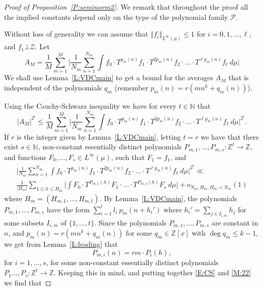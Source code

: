 \documentclass[11pt]{amsart}
\newcommand{\N}{\mathbb{N}}
\newcommand{\Z}{\mathbb{Z}}
\newcommand{\norm}[1]{\left\Vert #1\right\Vert}
\theoremstyle{plain}
\theoremstyle{definition}
\theoremstyle{remark}
\begin{document}
\begin{proof}[Proof of Proposition~\ref{P:seminorm2}]
We remark that  throughout the proof all the implied constants depend only on the type of
  the polynomial family  $\mathcal{P}$.

  Without loss of generality we can assume that
  $\norm{f_i}_{L^\infty(\mu)}\leq 1$ for $i=0,1,\ldots,\ell$, and $f_1
  \bot \mathcal{Z}$.  Let
  $$
 A_M=\frac{1}{M}\sum_{m=1}^M \Big|\frac{1}{N_m}\sum_{n=1}^{N_m} \int f_0\cdot  T^{p_m(n)} f_1
    \cdot T^{2p_m(n)}f_2\cdot\ldots\cdot T^{\ell p_m(n)}f_\ell\ d\mu\Big|
     $$
  We shall use Lemma~\ref{L:VDCmain} to get a bound for the averages
  $A_M$ that is independent of the polynomials $q_m$ (remember $p_m(n)=r(mn^k+q_m(n))$).


  Using the Cauchy-Schwarz inequality we have for every $t\in\N$ that
  \begin{equation}\label{E:CS}
    |A_M|^{2^t} \leq \frac{1}{M}\sum_{m=1}^{M}
      \Big| \frac{1}{N_m}\sum_{n=1}^{N_m} \int f_0\cdot  T^{p_m(n)}f_1
      \cdot T^{2p_m(n)}f_2\cdot\ldots\cdot T^{\ell p_m(n)}f_\ell\ d\mu\Big|^{2^t}.
  \end{equation}
  If $r$ is the integer given by Lemma~\ref{L:VDCmain}, letting $t=r$ we have that
  there exist $s \in \N$, non-constant essentially distinct polynomials
  $P_{m,1},\ldots,P_{m,s}\colon \Z^t\to\Z$, and functions
  $F_0,\ldots,F_s\in L^\infty(\mu)$, such that $F_1=f_1$, and
  \begin{multline}\label{M:22}
    \Big| \frac{1}{N_m}\sum_{n=1}^{N_m} \int f_0 \cdot T^{p_m(n)}f_1
      \cdot T^{2p_m(n)}f_2\cdot\ldots\cdot T^{\ell p_m(n)}f_\ell \ d\mu\Big|^{2^t}\ll \\
    \frac{1}{|H_m|}\sum_{1\leq h\leq H_m}\Big|\int F_0 \cdot
    T^{P_{m,1}(h)}F_1\cdot \ldots\cdot T^{P_{m,s}(h)}F_s \ d\mu \Big|
    +o_{N_m,H_m, H_m\prec N_m}(1)
  \end{multline}
  where $H_m=(H_{m,1},\ldots,H_{m,t})$.  By Lemma~\ref{L:VDCmain}, the
  polynomials $P_{m,1},\ldots, P_{m,s}$ have the form $ \sum_{i=1}^t
  l_i \ \! p_m(n+h_i') $ where $h_i'= \sum_{j\in I_{i,m}}h_j$ for some
  subsets $I_{i,m}$ of $\{1,\ldots,t\}$.  Since the polynomials
  $P_{m,1},\ldots,P_{m,s}$ are constant in $n$, and
  $p_m(n)=r(mn^k+q_m(n))$ for some $q_m\in \Z[x]$ with $\deg{q_m}\leq
  k-1$, we get from Lemma~\ref{L:leading} that
$$
P_{m,i}(n)=rm\! \cdot P_i(h),
$$ for $i=1,\ldots,s$,  for some non-constant essentially distinct polynomials
$P_1\ldots, P_s\colon \Z^t\to \Z$. Keeping this in mind, and putting
together \eqref{E:CS} and \eqref{M:22} we find that

\end{proof}
\end{document}
